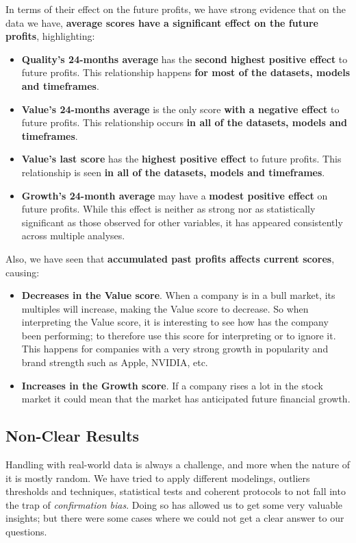 \documentclass[11pt,english,a4paper,hidelinks]{book}
\begin{document}
\noindent In terms of their effect on the future profits, we have strong evidence that on the data we have, \textbf{average scores have a significant effect on the future profits}, highlighting:
\begin{itemize}
    \item \textbf{Quality's 24-months average} has the \textbf{second highest positive effect} to future profits. This relationship happens \textbf{for most of the datasets, models and timeframes}.
    \item \textbf{Value's 24-months average} is the only score \textbf{with a negative effect} to future profits. This relationship occurs \textbf{in all of the datasets, models and timeframes}.
    \item \textbf{Value's last score} has the \textbf{highest positive effect} to future profits. This relationship is seen \textbf{in all of the datasets, models and timeframes}.
    \item \textbf{Growth's 24-month average} may have a \textbf{modest positive effect} on future profits. While this effect is neither as strong nor as statistically significant as those observed for other variables, it has appeared consistently across multiple analyses.
\end{itemize}

\noindent Also, we have seen that \textbf{accumulated past profits affects current scores}, causing:
\begin{itemize}
    \item \textbf{Decreases in the Value score}. When a company is in a bull market, its multiples will increase, making the Value score to decrease. So when interpreting the Value score, it is interesting to see how has the company been performing; to therefore use this score for interpreting or to ignore it. This happens for companies with a very strong growth in popularity and brand strength such as Apple, NVIDIA, etc.
    \item \textbf{Increases in the Growth score}. If a company rises a lot in the stock market it could mean that the market has anticipated future financial growth.
\end{itemize}

\subsection{Non-Clear Results}

\noindent Handling with real-world data is always a challenge, and more when the nature of it is mostly random. We have tried to apply different modelings, outliers thresholds and techniques, statistical tests and coherent protocols to not fall into the trap of \textit{confirmation bias}. Doing so has allowed us to get some very valuable insights; but there were some cases where we could not get a clear answer to our questions.
\end{document}
